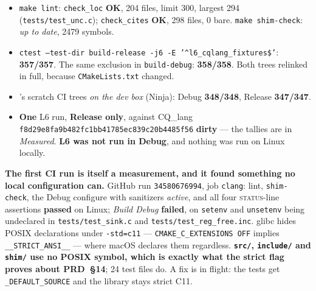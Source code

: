 \begin{itemize}[leftmargin=1.5em,itemsep=2pt,topsep=4pt,parsep=0pt]
\item \texttt{make lint}: \texttt{check\_loc} \textbf{OK}, 204 files, limit 300,
      largest 294 (\texttt{tests/test\_unc.c}); \texttt{check\_cites}
      \textbf{OK}, 298 files, 0 bare. \texttt{make shim-check}: \emph{up to
      date}, 2479 symbols.
\item \texttt{ctest --test-dir build-release -j6 -E
      '\textasciicircum{}l6\_cqlang\_fixtures\$'}: \textbf{357/357}. The same
      exclusion in \texttt{build-debug}: \textbf{358/358}. Both trees relinked in
      full, because \texttt{CMakeLists.txt} changed.
\item {}'s scratch CI trees \emph{on the dev box} (Ninja): Debug
      \textbf{348/348}, Release \textbf{347/347}.
\item \textbf{One} L6 run, \textbf{Release only}, against CQ\_lang
      \texttt{f8d29e8fa9b482fc1bb41785ec839c20b4485f56} \textbf{dirty} --- the
      tallies are in \emph{Measured}. \textbf{L6 was not run in Debug}, and
      nothing was run on Linux locally.
\end{itemize}

\noindent\textbf{The first CI run is itself a measurement, and it found something
no local configuration can.} GitHub run \texttt{34580676994}, job \texttt{clang}:
lint, \texttt{shim-check}, the Debug configure with sanitizers \emph{active}, and
all four \textsc{status}-line assertions \textbf{passed} on Linux;
\emph{Build Debug} \textbf{failed}, on \texttt{setenv} and \texttt{unsetenv}
being undeclared in \texttt{tests/test\_sink.c} and
\texttt{tests/test\_reg\_free.inc}. glibc hides POSIX declarations under
\texttt{-std=c11} --- \texttt{CMAKE\_C\_EXTENSIONS OFF} implies
\texttt{\_\_STRICT\_ANSI\_\_} --- where macOS declares them regardless.
\textbf{\texttt{src/}, \texttt{include/} and \texttt{shim/} use no POSIX symbol,
which is exactly what the strict flag proves about PRD~§14}; 24 test files do. A
fix is in flight: the tests get \texttt{\_DEFAULT\_SOURCE} and the library stays
strict C11.

